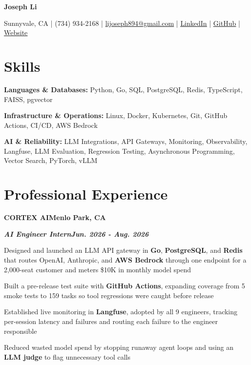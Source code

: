 \documentclass[10pt]{article}
\renewcommand{\resumeheader}[2]{%
  {\centering\fontsize{16}{18}\selectfont\bfseries #1\par}%
  \vspace{4pt}%
  {\centering\fontsize{10.5}{13}\selectfont #2\par}%
  \vspace{6pt}%
}
\renewcommand{\skill}[2]{\textbf{#1:} #2\par\vspace{1.5pt}}
\newcommand{\job}[4]{%
  \vspace{0pt}%
  \textbf{\MakeUppercase{#1}}\hfill\textbf{#2}\par
  \vspace{0.5pt}%
  \textbf{\textit{#3}}\hfill\textbf{\textit{#4}}\par
}
\begin{document}
\resumeheader{Joseph Li}{%
Sunnyvale, CA | (734) 934-2168 | \href{mailto:lijoseph894@gmail.com}{lijoseph894@gmail.com} | \href{https://www.linkedin.com/in/lijoseph894/}{\underline{LinkedIn}} | \href{https://github.com/josephl894}{\underline{GitHub}} | \href{https://josephl894.github.io}{\underline{Website}}}

\section{Skills}
\skill{Languages \& Databases}{Python, Go, SQL, PostgreSQL, Redis, TypeScript, FAISS, pgvector}
\skill{Infrastructure \& Operations}{Linux, Docker, Kubernetes, Git, GitHub Actions, CI/CD, AWS Bedrock}
\skill{AI \& Reliability}{LLM Integrations, API Gateways, Monitoring, Observability, Langfuse, LLM Evaluation, Regression Testing, Asynchronous Programming, Vector Search, PyTorch, vLLM}

\section{Professional Experience}
\job{Cortex AI}{Menlo Park, CA}{AI Engineer Intern}{Jun. 2026 - Aug. 2026}
\begin{bullets}
  \item Designed and launched an LLM API gateway in \textbf{Go}, \textbf{PostgreSQL}, and \textbf{Redis} that routes OpenAI, Anthropic, and \textbf{AWS Bedrock} through one endpoint for a 2,000-seat customer and meters \$10K in monthly model spend
  \item Built a pre-release test suite with \textbf{GitHub Actions}, expanding coverage from 5 smoke tests to 159 tasks so tool regressions were caught before release
  \item Established live monitoring in \textbf{Langfuse}, adopted by all 9 engineers, tracking per-session latency and failures and routing each failure to the engineer responsible
  \item Reduced wasted model spend by stopping runaway agent loops and using an \textbf{LLM judge} to flag unnecessary tool calls
\end{bullets}
\end{document}
